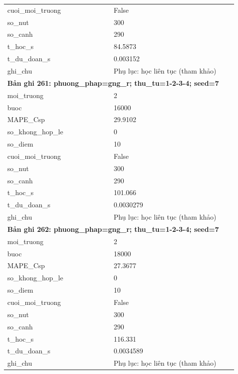 \begin{longtable}{p{0.43\linewidth}p{0.50\linewidth}}
cuoi\_\allowbreak moi\_\allowbreak truong & False \\
so\_\allowbreak nut & 300 \\
so\_\allowbreak canh & 290 \\
t\_\allowbreak hoc\_\allowbreak s & 84.5873 \\
t\_\allowbreak du\_\allowbreak doan\_\allowbreak s & 0.003152 \\
ghi\_\allowbreak chu & Phụ lục: học liên tục (tham khảo) \\
\midrule
\multicolumn{2}{p{0.95\linewidth}}{\textbf{Bản ghi 261: phuong\_phap=gng\_r; thu\_tu=1-2-3-4; seed=7}} \\
moi\_\allowbreak truong & 2 \\
buoc & 16000 \\
MAPE\_\allowbreak Csp & 29.9102 \\
so\_\allowbreak khong\_\allowbreak hop\_\allowbreak le & 0 \\
so\_\allowbreak diem & 10 \\
cuoi\_\allowbreak moi\_\allowbreak truong & False \\
so\_\allowbreak nut & 300 \\
so\_\allowbreak canh & 290 \\
t\_\allowbreak hoc\_\allowbreak s & 101.066 \\
t\_\allowbreak du\_\allowbreak doan\_\allowbreak s & 0.0030279 \\
ghi\_\allowbreak chu & Phụ lục: học liên tục (tham khảo) \\
\midrule
\multicolumn{2}{p{0.95\linewidth}}{\textbf{Bản ghi 262: phuong\_phap=gng\_r; thu\_tu=1-2-3-4; seed=7}} \\
moi\_\allowbreak truong & 2 \\
buoc & 18000 \\
MAPE\_\allowbreak Csp & 27.3677 \\
so\_\allowbreak khong\_\allowbreak hop\_\allowbreak le & 0 \\
so\_\allowbreak diem & 10 \\
cuoi\_\allowbreak moi\_\allowbreak truong & False \\
so\_\allowbreak nut & 300 \\
so\_\allowbreak canh & 290 \\
t\_\allowbreak hoc\_\allowbreak s & 116.331 \\
t\_\allowbreak du\_\allowbreak doan\_\allowbreak s & 0.0034589 \\
ghi\_\allowbreak chu & Phụ lục: học liên tục (tham khảo) \\

\end{longtable}
